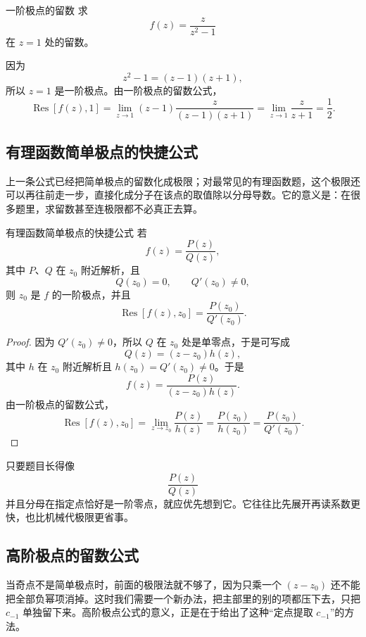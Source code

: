 \begin{lizi}{一阶极点的留数}{}
求
\[
    f(z)=\frac{z}{z^2-1}
\]
在 $z=1$ 处的留数。

\begin{jie}
因为
\[
    z^2-1=(z-1)(z+1),
\]
所以 $z=1$ 是一阶极点。由一阶极点的留数公式，
\[
    \operatorname{Res}[f(z),1]
    =
    \lim_{z\to 1}(z-1)\frac{z}{(z-1)(z+1)}
    =
    \lim_{z\to 1}\frac{z}{z+1}
    =
    \frac{1}{2}.
\]
\end{jie}
\end{lizi}

\subsection{有理函数简单极点的快捷公式}

上一条公式已经把简单极点的留数化成极限；对最常见的有理函数题，这个极限还可以再往前走一步，直接化成分子在该点的取值除以分母导数。它的意义是：在很多题里，求留数甚至连极限都不必真正去算。

\begin{dingli}{有理函数简单极点的快捷公式}{}
若
\[
    f(z)=\frac{P(z)}{Q(z)},
\]
其中 $P$、$Q$ 在 $z_0$ 附近解析，且
\[
    Q(z_0)=0,\qquad Q'(z_0)\neq 0,
\]
则 $z_0$ 是 $f$ 的一阶极点，并且
\[
    \operatorname{Res}[f(z),z_0]
    =
    \frac{P(z_0)}{Q'(z_0)}.
\]
\end{dingli}

\begin{proof}
因为 $Q'(z_0)\neq 0$，所以 $Q$ 在 $z_0$ 处是单零点，于是可写成
\[
    Q(z)=(z-z_0)h(z),
\]
其中 $h$ 在 $z_0$ 附近解析且 $h(z_0)=Q'(z_0)\neq 0$。于是
\[
    f(z)=\frac{P(z)}{(z-z_0)h(z)}.
\]
由一阶极点的留数公式，
\[
    \operatorname{Res}[f(z),z_0]
    =
    \lim_{z\to z_0}\frac{P(z)}{h(z)}
    =
    \frac{P(z_0)}{h(z_0)}
    =
    \frac{P(z_0)}{Q'(z_0)}.
\]
\end{proof}

\begin{tishi}[这条快捷公式什么时候最好用]
只要题目长得像
\[
    \frac{P(z)}{Q(z)}
\]
并且分母在指定点恰好是一阶零点，就应优先想到它。它往往比先展开再读系数更快，也比机械代极限更省事。
\end{tishi}

\subsection{高阶极点的留数公式}

当奇点不是简单极点时，前面的极限法就不够了，因为只乘一个 $(z-z_0)$ 还不能把全部负幂项消掉。这时我们需要一个新办法，把主部里的别的项都压下去，只把 $c_{-1}$ 单独留下来。高阶极点公式的意义，正是在于给出了这种``定点提取 $c_{-1}$''的方法。

